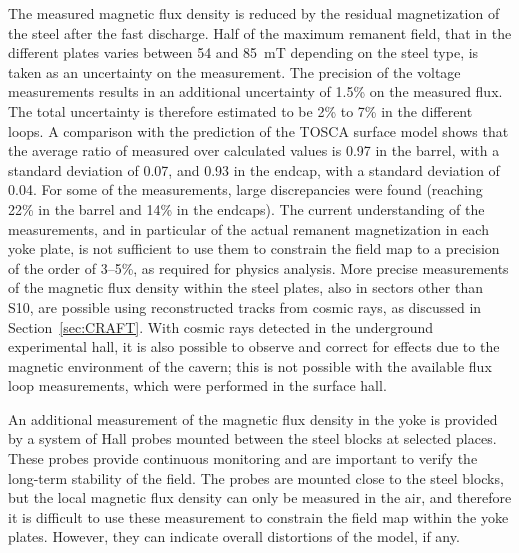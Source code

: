 The measured magnetic flux density is reduced by the residual
magnetization of the steel after the fast discharge.
Half of the maximum remanent field, that in the different plates
varies between 54 and 85~mT depending on the steel type, is taken as an
uncertainty on the measurement.
The precision of the voltage measurements results in an additional
uncertainty of 1.5\% on the measured flux. The total uncertainty is
therefore estimated to be 2\% to 7\% in the different loops.
A comparison with the prediction of the TOSCA surface model shows that
the average ratio of measured over calculated values is 0.97 in the barrel, with a standard
deviation of 0.07, and 0.93 in the endcap, with a standard
deviation of 0.04. For some of the measurements, large discrepancies
were found (reaching 22\% in the barrel and 14\% in the endcaps).
The current understanding of the measurements, and in particular of
the actual remanent magnetization in each yoke plate, is not
sufficient to use them to constrain the field map to a precision of
the order of 3--5\%, as required for physics analysis.
More precise measurements of the magnetic flux density within the steel
plates, also in sectors other than S10, are
possible using reconstructed tracks from cosmic rays, as discussed in
Section~\ref{sec:CRAFT}. With cosmic rays detected in the underground
experimental hall, it is also possible to observe and correct for effects due to
the magnetic environment of the cavern; this is not possible with the
available flux loop measurements, which were performed in the surface hall.

An additional measurement of the magnetic flux density in the yoke is
provided by a system of Hall probes mounted between the steel
blocks at selected places. These probes provide continuous monitoring
and are important to verify the long-term stability of the field.
The probes are mounted close to the steel blocks, but the local
magnetic flux density can only be measured in the air, and therefore
it is difficult to use these measurement to constrain the field map
within the yoke plates.
However, they can indicate overall distortions of the model, if any.

